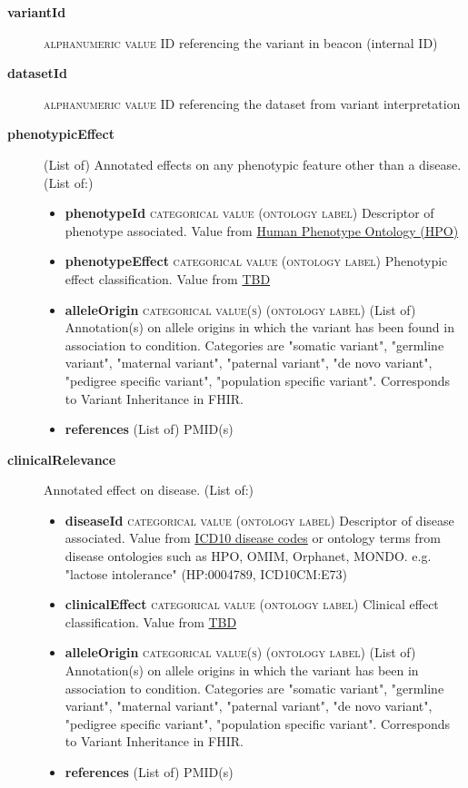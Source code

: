 \documentclass[a4paper, 10pt]{article}        %
\begin{document}
  \begin{description}
  	\item[\textbf{variantId}] {\textsc{alphanumeric value}} ID referencing the variant in beacon (internal ID)
	\item[\textbf{datasetId}] {\textsc{alphanumeric value}} ID referencing the dataset from variant interpretation
	\item[\textbf{phenotypicEffect}] (List of) Annotated effects on any phenotypic feature other than a disease. (List of:)
	\begin{itemize}
				\item[] \textbf{phenotypeId} {\textsc{categorical value (ontology label)}} Descriptor of phenotype associated. Value from \href{http:purl.obolibrary.org/obo/HP_0000001}{Human Phenotype Ontology (HPO)}
				\item[] \textbf{phenotypeEffect} {\textsc{categorical value (ontology label)}} Phenotypic effect classification. Value from \href{}{TBD}
				\item[] \textbf{alleleOrigin} {\textsc{categorical value(s) (ontology label)}} (List of) Annotation(s) on allele origins in which the variant has been found in association to condition. Categories are "somatic variant", "germline variant", "maternal variant", "paternal variant",  "de novo variant", "pedigree specific variant", "population specific variant". Corresponds to Variant Inheritance in FHIR.
				\item[] \textbf{references} (List of) PMID(s)
	\end{itemize} 
	\item[\textbf{clinicalRelevance}] Annotated effect on disease. (List of:)
			\begin{itemize}
				\item[] \textbf{diseaseId} {\textsc{categorical value (ontology label)}} Descriptor of disease associated. Value from \href{https://www.who.int/classifications/icd/en/}{ICD10 disease codes} or ontology terms from disease ontologies such as HPO, OMIM, Orphanet, MONDO. e.g. "lactose intolerance" (HP:0004789, ICD10CM:E73)
				\item[] \textbf{clinicalEffect} {\textsc{categorical value (ontology label)}} Clinical effect classification. Value from \href{}{TBD}
				\item[] \textbf{alleleOrigin} {\textsc{categorical value(s) (ontology label)}} (List of) Annotation(s) on allele origins in which the variant has been in association to condition. Categories are "somatic variant", "germline variant", "maternal variant", "paternal variant",  "de novo variant", "pedigree specific variant", "population specific variant". Corresponds to Variant Inheritance in FHIR.
				\item[] \textbf{references} (List of) PMID(s)
		 \end{itemize} 

 \end{description}
 
\end{document}
